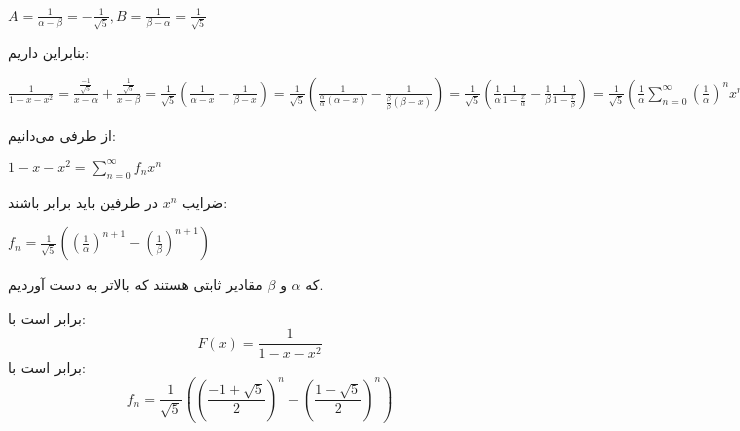 \begin{enumerate}
\begin{center}
                    $A = \frac{1}{\alpha - \beta} = -\frac{1}{\sqrt{5}}, B = \frac{1}{\beta - \alpha} = \frac{1}{\sqrt{5}}$\\
                \end{center}
                بنابراین داریم:\\
                \begin{center}
                    $\frac{1}{1 - x - x^2} = \frac{\frac{-1}{\sqrt{5}}}{x - \alpha} + \frac{\frac{1}{\sqrt{5}}}{x - \beta} 
                    = \frac{1}{\sqrt{5}}(\frac{1}{\alpha - x} - \frac{1}{\beta - x}) 
                    = \frac{1}{\sqrt{5}}(\frac{1}{ \frac{\alpha}{\alpha}(\alpha - x)} - \frac{1}{ \frac{\beta}{\beta}(\beta - x)})
                    = \frac{1}{\sqrt{5}}(\frac{1}{\alpha}\frac{1}{1 - \frac{x}{\alpha} } - \frac{1}{\beta}\frac{1}{1 - \frac{x}{\beta}}) 
                    = \frac{1}{\sqrt{5}}(\frac{1}{\alpha}\sum_{n = 0}^{\infty} (\frac{1}{\alpha})^nx^n - \frac{1}{\beta}\sum_{n = 0}^{\infty} (\frac{1}{\beta})^nx^n)
                    = \frac{1}{\sqrt{5}}(\sum_{n = 0}^{\infty} (\frac{1}{\alpha}^{n+1} - \frac{1}{\beta}^{n + 1})x^n)$
                \end{center}
                از طرفی می‌دانیم:\\
                \begin{center}
                $1 - x - x^2 = \sum_{n = 0}^{\infty} f_nx^n$\\
                \end{center}
                
                ضرایب $x^n$ در طرفین باید برابر باشند:\\
                \begin{center}
                $f_n = \frac{1}{\sqrt{5}}( (\frac{1}{\alpha})^{n + 1} - (\frac{1}{\beta})^{n + 1}   )$
                \end{center}
                که 
                $\alpha$
                و 
                $\beta$
                مقادیر ثابتی هستند که بالاتر به دست آوردیم.
\end{enumerate}

\begin{theorem}
\p
{}
برابر است با:
 $$F(x) = \frac{1}{1 - x - x^2}$$
برابر است با:
$$f_n = \frac{1}{\sqrt{5}}((\frac{-1 + \sqrt{5}}{2})^{n} - (\frac{1 - \sqrt{5}}{2})^{n})$$
\end{theorem}